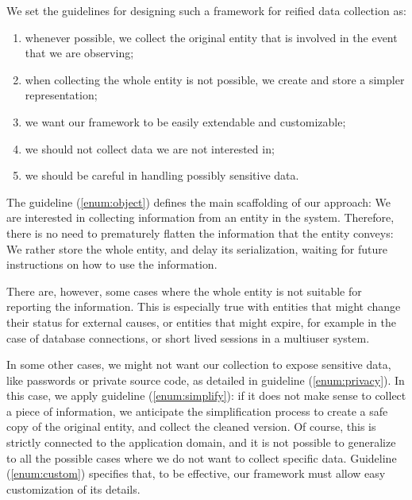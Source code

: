 We set the guidelines for designing such a framework for reified data collection as:

\begin{enumerate}
  \item\label{enum:object} whenever possible, we collect the original entity that is involved in the event that we are observing;
  \item\label{enum:simplify} when collecting the whole entity is not possible, we create and store a simpler representation;
  \item\label{enum:custom} we want our framework to be easily extendable and customizable;
  \item\label{enum:domain-specific} we should not collect data we are not interested in;
  \item\label{enum:privacy} we should be careful in handling possibly sensitive data.
\end{enumerate}

The guideline (\ref{enum:object}) defines the main scaffolding of our approach: We are interested in collecting information from an entity in the system.
Therefore, there is no need to prematurely flatten the information that the entity conveys: We rather store the whole entity, and delay its serialization, waiting for future instructions on how to use the information.

There are, however, some cases where the whole entity is not suitable for reporting the information.
This is especially true with entities that might change their status for external causes, or entities that might expire, for example in the case of database connections, or short lived sessions in a multiuser system.

In some other cases, we might not want our collection to expose sensitive data, like passwords or private source code, as detailed in guideline (\ref{enum:privacy}).
In this case, we apply guideline (\ref{enum:simplify}): if it does not make sense to collect a piece of information, we anticipate the simplification process to create a safe copy of the original entity, and collect the cleaned version.
Of course, this is strictly connected to the application domain, and it is not possible to generalize to all the possible cases where we do not want to collect specific data.
Guideline (\ref{enum:custom}) specifies that, to be effective, our framework must allow easy customization of its details.

